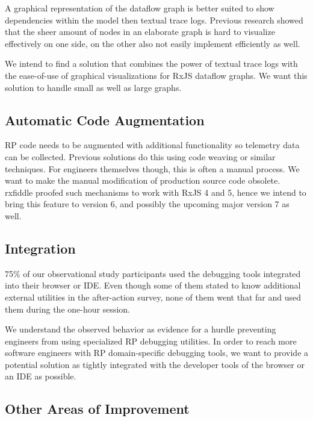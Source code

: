 \documentclass[sigplan,screen,review]{acmart}
\begin{document}
A graphical representation of the dataflow graph is better suited to show dependencies within the model then textual trace logs. Previous research showed that the sheer amount of nodes in an elaborate graph is hard to visualize effectively\cite{10.1145/3180155.3180156} on one side, on the other also not easily implement efficiently as well.

We intend to find a solution that combines the power of textual trace logs with the ease-of-use of graphical visualizations for RxJS dataflow graphs. We want this solution to handle small as well as large graphs.

\subsection{Automatic Code Augmentation}

RP code needs to be augmented with additional functionality so telemetry data can be collected. Previous solutions do this using code weaving\cite{10.1145/2884781.2884815} or similar techniques\cite{10.1145/3180155.3180156}. For engineers themselves though, this is often a manual process. We want to make the manual modification of production source code obsolete. rxfiddle proofed such mechanisms to work with RxJS 4 and 5, hence we intend to bring this feature to version 6, and possibly the upcoming major version 7 as well.

\subsection{Integration}

75\% of our observational study participants used the debugging tools integrated into their browser or IDE. Even though some of them stated to know additional external utilities in the after-action survey, none of them went that far and used them during the one-hour session.

We understand the observed behavior as evidence for a hurdle preventing engineers from using specialized RP debugging utilities. In order to reach more software engineers with RP domain-specific debugging tools, we want to provide a potential solution as tightly integrated with the developer tools of the browser or an IDE as possible.

\subsection{Other Areas of Improvement}
\end{document}
